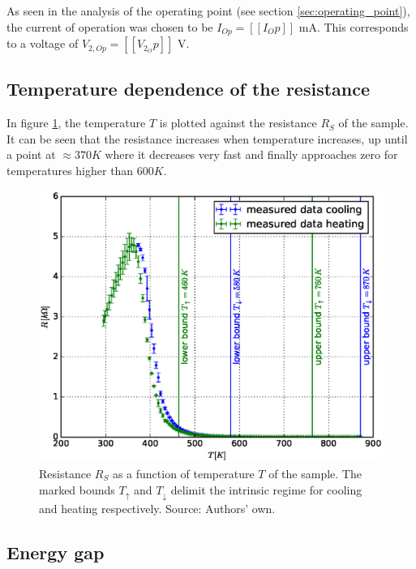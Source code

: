\documentclass[a4paper]{article}
\begin{document}
As seen in the analysis of the operating point (see section \ref{sec:operating_point}), the current of operation was chosen to be $I_{Op} = [[I_Op]]$ mA. This corresponds to a voltage of $V_{2,Op} = [[V_2_Op]]$ V.

\subsection{Temperature dependence of the resistance}

In figure \ref{fig:temperature_resistance}, the temperature $T$ is plotted against the resistance $R_S$ of the sample. It can be seen that the resistance increases when temperature increases, up until a point at  $\approx 370 K$ where it decreases very fast and finally approaches zero for temperatures higher than $600 K$.

\begin{figure}[H]
\captionsetup{singlelinecheck=off}
\centering
\includegraphics[width=1.0\textwidth]{plots/temperature_resistance.eps}
\caption[blubb]{Resistance $R_S$ as a function of temperature $T$ of the sample. The marked bounds $T_{\uparrow}$ and $T_{\downarrow}$ delimit the intrinsic regime for cooling and heating respectively. Source: Authors' own.}
\label{fig:temperature_resistance}
\end{figure}

\subsection{Energy gap}
\end{document}
